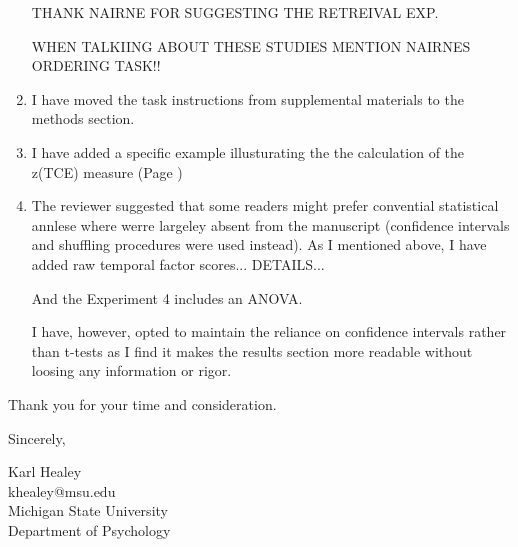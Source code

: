 \documentclass[12pt]{article}
\begin{document}
\begin{enumerate}
	THANK NAIRNE FOR SUGGESTING THE RETREIVAL EXP. 

	WHEN TALKIING ABOUT THESE STUDIES MENTION NAIRNES ORDERING TASK!!

	\item
	I have moved the task instructions from supplemental materials to the methods section.

	\item
	I have added a specific example illusturating the the calculation of the z(TCE) measure  (Page \pageref{TODO-15})

	\item
	The reviewer suggested that some readers might prefer convential statistical annlese where werre largeley absent from the manuscript (confidence intervals and shuffling procedures were used instead). As I mentioned above, I have added raw temporal factor scores... DETAILS... 

	And the Experiment 4 includes an ANOVA.

	I have, however, opted to maintain the reliance on confidence intervals rather than t-tests as I find it makes the results section more readable without loosing any information or rigor. 



	

\end{enumerate}





\vspace{20pt}

Thank you for your time and consideration.

\vspace{10pt}

Sincerely,

\vspace{10pt}

Karl Healey\\
khealey@msu.edu\\
Michigan State University\\
Department of Psychology

%
\end{document}
